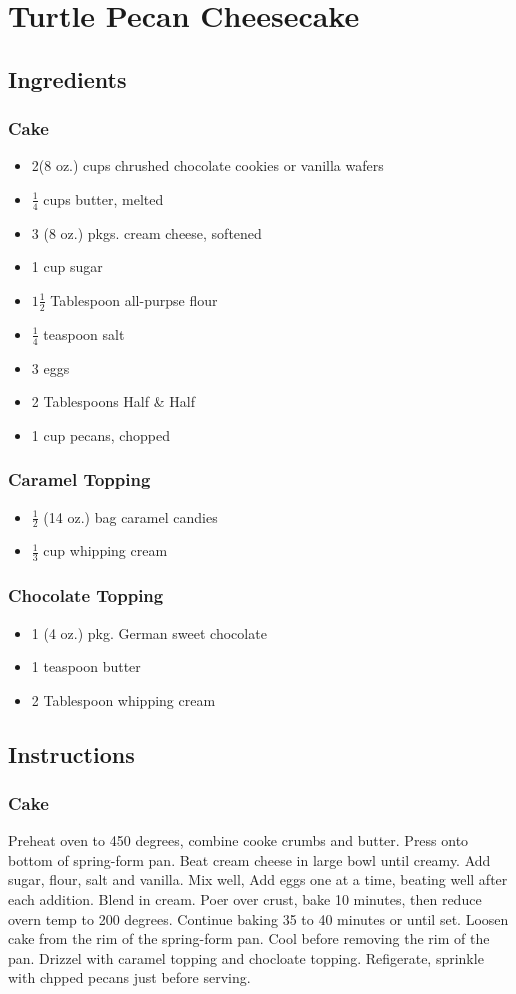 \documentclass{book}
\begin{document}
\section*{Turtle Pecan Cheesecake}
\subsection*{Ingredients}
\subsubsection*{Cake}
\begin{itemize}
\item
2(8 oz.) cups chrushed chocolate cookies or vanilla wafers
\item
$\frac{1}{4}$ cups butter, melted
\item
3 (8 oz.) pkgs. cream cheese, softened
\item
1 cup sugar
\item
$1\frac{1}{2}$ Tablespoon all-purpse flour
\item
$\frac{1}{4}$ teaspoon salt
\item
3 eggs
\item
2 Tablespoons Half & Half
\item
1 cup pecans, chopped
\end{itemize}
\subsubsection*{Caramel Topping}
\begin{itemize}
\item
$\frac{1}{2}$ (14 oz.) bag caramel candies
\item
$\frac{1}{3}$ cup whipping cream
\end{itemize}
\subsubsection*{Chocolate Topping}
\begin{itemize}
\item
1 (4 oz.) pkg. German sweet chocolate
\item
1 teaspoon butter
\item
2 Tablespoon whipping cream
\end{itemize}
\subsection*{Instructions}
\subsubsection*{Cake}
Preheat oven to 450 degrees, combine cooke crumbs and butter. Press onto bottom of spring-form pan. Beat cream cheese in large bowl until creamy. Add sugar, flour, salt and vanilla. Mix well, Add eggs one at a time, beating well after each addition. Blend in cream. Poer over crust, bake 10 minutes, then reduce overn temp to 200 degrees. Continue baking 35 to 40 minutes or until set. Loosen cake from the rim of the spring-form pan. Cool before removing the rim of the pan. Drizzel with caramel topping and chocloate topping. Refigerate, sprinkle with chpped pecans just before serving.
\end{document}
